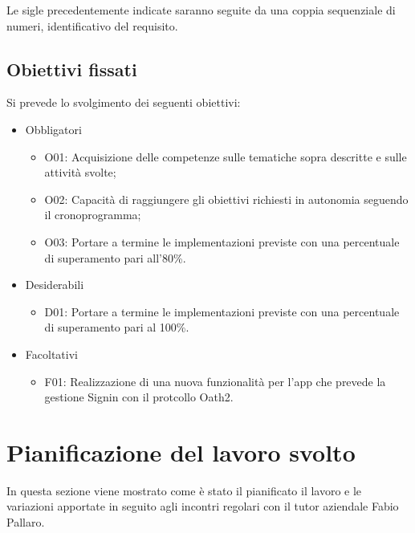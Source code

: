 Le sigle precedentemente indicate saranno seguite da una coppia sequenziale di numeri, identificativo del requisito.

\subsection*{Obiettivi fissati}
Si prevede lo svolgimento dei seguenti obiettivi:
\begin{itemize}
	\item Obbligatori
	\begin{itemize}
		\item	O01: Acquisizione delle competenze sulle tematiche sopra descritte e sulle attività svolte; \\
		\item O02: Capacità di raggiungere gli obiettivi richiesti in autonomia seguendo il cronoprogramma;\\
		\item O03: Portare a termine le implementazioni previste con una percentuale di superamento pari all’80\%.\\
	\end{itemize}
	
	\item Desiderabili 
	\begin{itemize}
		\item D01: Portare a termine le implementazioni previste con una percentuale di superamento pari al 100\%.\\
	\end{itemize}
	
	\item Facoltativi
	\begin{itemize}
		\item F01:  Realizzazione di una nuova funzionalità per l'app che prevede la gestione Signin con il protcollo Oath2.\\
	\end{itemize} 
\end{itemize}

\section{Pianificazione del lavoro svolto}
In questa sezione viene mostrato come è stato il pianificato il lavoro e le variazioni apportate in seguito agli incontri regolari con il tutor aziendale Fabio Pallaro.
